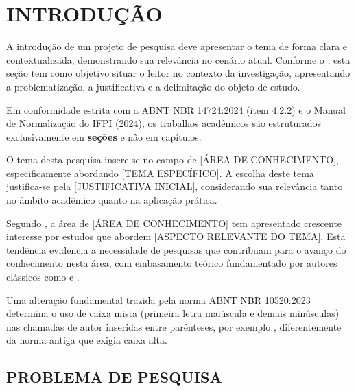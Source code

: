 \documentclass[
    12pt,        %
    openany,     %
    oneside,     %
    a4paper,     %
    english,     %
    french,      %
    spanish,     %
    brazil,      %
    article      %
]{abntex2}
\begin{document}
\frenchspacing




\section{INTRODUÇÃO}
\label{sec:introducao}

A introdução de um projeto de pesquisa deve apresentar o tema de forma clara e contextualizada, demonstrando sua relevância no cenário atual. Conforme o , esta seção tem como objetivo situar o leitor no contexto da investigação, apresentando a problematização, a justificativa e a delimitação do objeto de estudo.

Em conformidade estrita com a ABNT NBR 14724:2024 (item 4.2.2) e o Manual de Normalização do IFPI (2024), os trabalhos acadêmicos são estruturados exclusivamente em \textbf{seções} e não em capítulos. 

O tema desta pesquisa insere-se no campo de [ÁREA DE CONHECIMENTO], especificamente abordando [TEMA ESPECÍFICO]. A escolha deste tema justifica-se pela [JUSTIFICATIVA INICIAL], considerando sua relevância tanto no âmbito acadêmico quanto na aplicação prática.

Segundo , a área de [ÁREA DE CONHECIMENTO] tem apresentado crescente interesse por estudos que abordem [ASPECTO RELEVANTE DO TEMA]. Esta tendência evidencia a necessidade de pesquisas que contribuam para o avanço do conhecimento nesta área, com embasamento teórico fundamentado por autores clássicos como  e .

Uma alteração fundamental trazida pela norma ABNT NBR 10520:2023 determina o uso de caixa mista (primeira letra maiúscula e demais minúsculas) nas chamadas de autor inseridas entre parênteses, por exemplo \cite{marconi2017}, diferentemente da norma antiga que exigia caixa alta.


\subsection{PROBLEMA DE PESQUISA}
\label{subsec:problema}
\end{document}
